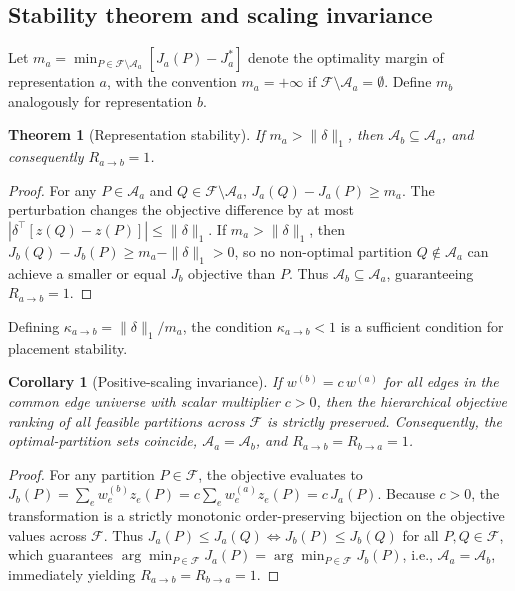 \documentclass[
  aps,
  pra,
  reprint,
  amsmath,
  amssymb,
  longbibliography,
  nofootinbib,
  floatfix
]{revtex4-2}
\theoremstyle{plain}
\newtheorem{theorem}{Theorem}
\newtheorem{corollary}{Corollary}
\begin{document}
\subsection{Stability theorem and scaling invariance}

Let $m_a=\min_{P\in\mathcal{F}\setminus\mathcal{A}_a}[J_a(P)-J_a^*]$ denote the optimality margin of representation $a$, with the convention $m_a=+\infty$ if $\mathcal{F}\setminus\mathcal{A}_a=\emptyset$. Define $m_b$ analogously for representation $b$.

\begin{theorem}[Representation stability]\label{thm:stability}
If $m_a>\|\delta\|_1$, then $\mathcal{A}_b\subseteq\mathcal{A}_a$, and consequently $R_{a\to b}=1$.
\end{theorem}
\begin{proof}
For any $P\in\mathcal{A}_a$ and $Q\in\mathcal{F}\setminus\mathcal{A}_a$, $J_a(Q)-J_a(P)\ge m_a$. The perturbation changes the objective difference by at most $|\delta^\top[z(Q)-z(P)]|\le\|\delta\|_1$. If $m_a>\|\delta\|_1$, then $J_b(Q)-J_b(P)\ge m_a-\|\delta\|_1>0$, so no non-optimal partition $Q\notin\mathcal{A}_a$ can achieve a smaller or equal $J_b$ objective than $P$. Thus $\mathcal{A}_b\subseteq\mathcal{A}_a$, guaranteeing $R_{a\to b}=1$.
\end{proof}

Defining $\kappa_{a\to b}=\|\delta\|_1/m_a$, the condition $\kappa_{a\to b}<1$ is a sufficient condition for placement stability.

\begin{corollary}[Positive-scaling invariance]\label{cor:scaling}
If $w^{(b)}=c\,w^{(a)}$ for all edges in the common edge universe with scalar multiplier $c>0$, then the hierarchical objective ranking of all feasible partitions across $\mathcal{F}$ is strictly preserved. Consequently, the optimal-partition sets coincide, $\mathcal{A}_a=\mathcal{A}_b$, and $R_{a\to b}=R_{b\to a}=1$.
\end{corollary}
\begin{proof}
For any partition $P\in\mathcal{F}$, the objective evaluates to $J_b(P)=\sum_e w_e^{(b)}z_e(P)=c\sum_e w_e^{(a)}z_e(P)=c\,J_a(P)$. Because $c>0$, the transformation is a strictly monotonic order-preserving bijection on the objective values across $\mathcal{F}$. Thus $J_a(P)\le J_a(Q)\iff J_b(P)\le J_b(Q)$ for all $P,Q\in\mathcal{F}$, which guarantees $\arg\min_{P\in\mathcal{F}} J_a(P)=\arg\min_{P\in\mathcal{F}} J_b(P)$, i.e., $\mathcal{A}_a=\mathcal{A}_b$, immediately yielding $R_{a\to b}=R_{b\to a}=1$.
\end{proof}
\end{document}
